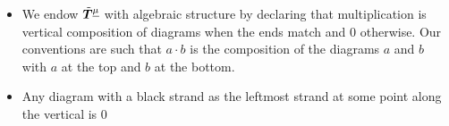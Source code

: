 \documentclass{article}
\begin{document}
\begin{defn}
\begin{itemize}
\[{        \draw (1,0)..controls (1,0.5) and (0,0.5) .. (0,1);
        \draw[pstdhl] (0,0) node[below]{\small $\mu_i$} ..controls (0,0.5) and (1,0.5) .. (1,1);
        }\hspace{2mm} =
        \hspace{2mm} deg\hspace{2mm} \tikzdiag[scale=1]{
        \draw (0,0)  ..controls (0,0.5) and (1,0.5) .. (1,1);
        \draw[pstdhl] (1,0) node[below]{\small $\mu_i$} ..controls (1,0.5) and (0,0.5) .. (0,1);
        } \hspace{2mm} = q^{\mu_i}
        \]
        \[
        deg\hspace{2mm} \tikzdiag[scale=1]{
        \draw (0,0) -- (0,1) node[tikzdot, pos=0.5]{};
        
        }\hspace{2mm} =
        \hspace{2mm} q^{2}
        \]
        \[
        deg\hspace{2mm} \tikzdiag[scale=1]{
        \draw (1,0)..controls (1,0.5) and (0,0.5) .. (0,0.5);
        \draw (0,0.5) ..controls (0,0.5) and (1,0.5) .. (1,1);
        \draw[pstdhl] (0,0) node[below]{\small $\mu_i$} --(0,1) node[midway,nail]{};
        }\hspace{2mm} =
        \hspace{2mm} h q^{2 \mu_i}
        \]
        \item We endow $\tilde{{\boldsymbol{T}}}^{\underline{\mu}}$ with algebraic structure by declaring that multiplication is vertical composition of diagrams when the ends match and $0$ otherwise. Our conventions are such that $a\cdot b$ is the composition of the diagrams $a$ and $b$ with $a$ at the top and $b$ at the bottom. 
        \item Any diagram with a black strand as the leftmost strand at some point along the vertical is 0
        
    \end{itemize}
\end{defn}
\end{document}

